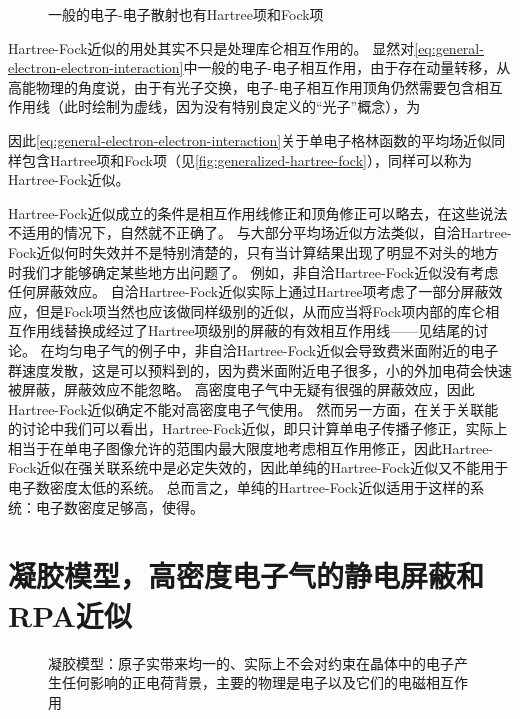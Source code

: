 \begin{figure}
    \centering
    
    \caption{一般的电子-电子散射也有Hartree项和Fock项}
    \label{fig:generalized-hartree-fock}
\end{figure}

Hartree-Fock近似的用处其实不只是处理库仑相互作用的。
显然对\eqref{eq:general-electron-electron-interaction}中一般的电子-电子相互作用，由于存在动量转移，从高能物理的角度说，由于有光子交换，电子-电子相互作用顶角仍然需要包含相互作用线（此时绘制为虚线，因为没有特别良定义的“光子”概念），为

因此\eqref{eq:general-electron-electron-interaction}关于单电子格林函数的平均场近似同样包含Hartree项和Fock项（见\autoref{fig:generalized-hartree-fock}），同样可以称为Hartree-Fock近似。

Hartree-Fock近似成立的条件是相互作用线修正和顶角修正可以略去，在这些说法不适用的情况下，自然就不正确了。
与大部分平均场近似方法类似，自洽Hartree-Fock近似何时失效并不是特别清楚的，只有当计算结果出现了明显不对头的地方时我们才能够确定某些地方出问题了。
例如，非自洽Hartree-Fock近似没有考虑任何屏蔽效应。
自洽Hartree-Fock近似实际上通过Hartree项考虑了一部分屏蔽效应，但是Fock项当然也应该做同样级别的近似，从而应当将Fock项内部的库仑相互作用线替换成经过了Hartree项级别的屏蔽的有效相互作用线——见结尾的讨论。
在均匀电子气的例子中，非自洽Hartree-Fock近似会导致费米面附近的电子群速度发散，这是可以预料到的，因为费米面附近电子很多，小的外加电荷会快速被屏蔽，屏蔽效应不能忽略。
高密度电子气中无疑有很强的屏蔽效应，因此Hartree-Fock近似确定不能对高密度电子气使用。
然而另一方面，在关于关联能的讨论中我们可以看出，Hartree-Fock近似，即只计算单电子传播子修正，实际上相当于在单电子图像允许的范围内最大限度地考虑相互作用修正，因此Hartree-Fock近似在强关联系统中是必定失效的，因此单纯的Hartree-Fock近似又不能用于电子数密度太低的系统。
总而言之，单纯的Hartree-Fock近似适用于这样的系统：电子数密度足够高，使得。

\section{凝胶模型，高密度电子气的静电屏蔽和RPA近似}\label{sec:high-density}

\begin{figure}
    \centering
    
    \caption{凝胶模型：原子实带来均一的、实际上不会对约束在晶体中的电子产生任何影响的正电荷背景，主要的物理是电子以及它们的电磁相互作用}
\end{figure}

